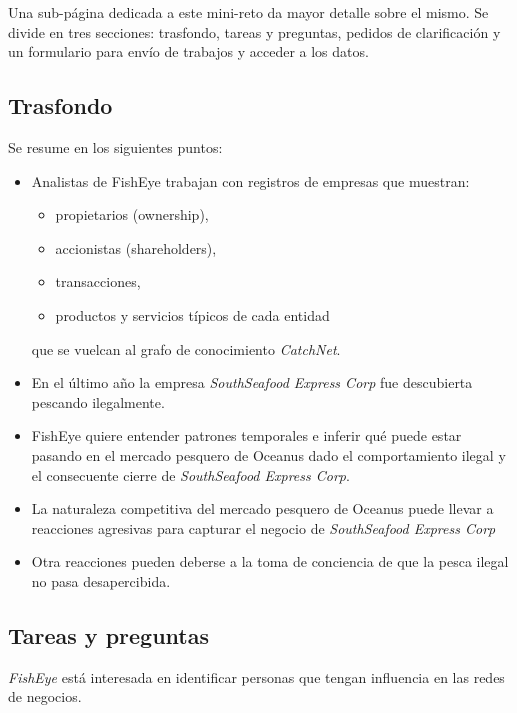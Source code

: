 \documentclass[11pt,spanish,a4paper]{article}
\begin{document}
Una sub-página dedicada a este mini-reto da mayor detalle sobre el mismo.
Se divide en tres secciones: trasfondo, tareas y preguntas, pedidos de clarificación y un formulario para envío de trabajos y acceder a los datos.

\subsection{Trasfondo}
Se resume en los siguientes puntos:
\begin{itemize}
	\item Analistas de FishEye trabajan con registros de empresas que muestran:
	\begin{itemize}
		\item propietarios (ownership),
		\item accionistas (shareholders),
		\item transacciones,
		\item productos y servicios típicos de cada entidad
	\end{itemize}
	que se vuelcan al grafo de conocimiento \emph{CatchNet}.
	\item En el último año la empresa \emph{SouthSeafood Express Corp} fue descubierta pescando ilegalmente.
	\item FishEye quiere entender patrones temporales e inferir qué puede estar pasando en el mercado pesquero de Oceanus dado el comportamiento ilegal y el consecuente cierre de \emph{SouthSeafood Express Corp}. 
	\item La naturaleza competitiva del mercado pesquero de Oceanus puede llevar a reacciones agresivas para capturar el negocio de \emph{SouthSeafood Express Corp}
	\item Otra reacciones pueden deberse a la toma de conciencia de que la pesca ilegal no pasa desapercibida.
\end{itemize}


\subsection{Tareas y preguntas}
\emph{FishEye} está interesada en identificar personas que tengan influencia en las redes de negocios.
\end{document}
